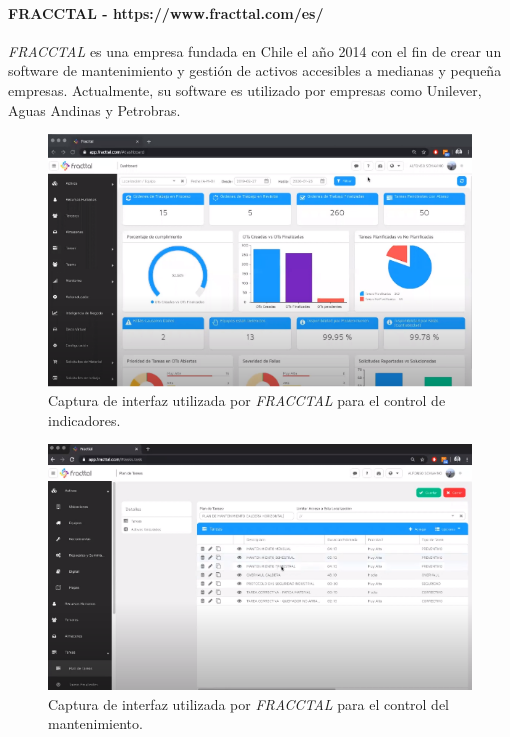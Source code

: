 \paragraph{FRACCTAL - https://www.fracttal.com/es/}

\textit{FRACCTAL} es una empresa fundada en Chile el año 2014 con el fin de crear un software de mantenimiento y gestión de activos accesibles a medianas y pequeña empresas. Actualmente, su software es utilizado por empresas como Unilever, Aguas Andinas y Petrobras.

\begin{figure}[H]
\centering
\includegraphics[scale=0.9]{images/fracctal.png}
\caption{Captura de interfaz utilizada por \textit{FRACCTAL} para el control de indicadores.}
\label{fracctal}
\end{figure}


\begin{figure}[H]
\centering
\includegraphics[scale=0.9]{images/fracctal2.png}
\caption{Captura de interfaz utilizada por \textit{FRACCTAL} para el control del mantenimiento.}
\label{fracctal2}
\end{figure}

